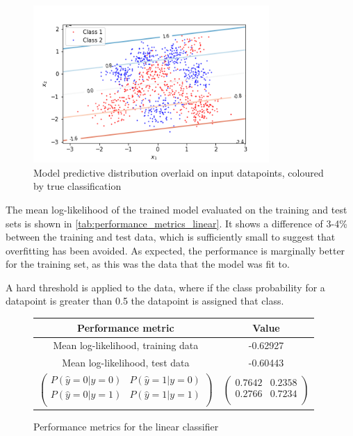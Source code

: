 \documentclass[a4paper]{article}
\begin{document}
    \begin{figure}[h]
        \label{fig:predictive_distribution_linear}
        \centering
        \includegraphics[width=0.8\textwidth]{plots/predictive_distribution_linear.png}
        \caption{Model predictive distribution overlaid on input datapoints, coloured by true classification}
    \end{figure}

    The mean log-likelihood of the trained model evaluated on the training and test sets is shown in
    \autoref{tab:performance_metrics_linear}. It shows a difference of 3-4\% between the training and test data, which is
    sufficiently small to suggest that overfitting has been avoided. As expected, the performance is marginally better
    for the training set, as this was the data that the model was fit to.

    A hard threshold is applied to the data, where if the class probability for a datapoint is greater than 0.5 the
    datapoint is assigned that class.

    \begin{figure}[h]
        \label{tab:performance_metrics_linear}
        \centering
        \begin{tabular}{c|c}
            \textbf{Performance metric} & \textbf{Value} \\
            \hline
            Mean log-likelihood, training data & -0.62927 \\
            Mean log-likelihood, test data & -0.60443 \\
            $\begin{pmatrix}
                 P(\hat{y}=0 | y=0) & P(\hat{y}=1 | y=0) \\
                 P(\hat{y}=0 | y=1) & P(\hat{y}=1 | y=1) \\
            \end{pmatrix}$ &
            $\begin{pmatrix}
                0.7642 & 0.2358 \\
                0.2766 & 0.7234 \\
            \end{pmatrix}$ \\
        \end{tabular}
        \caption{Performance metrics for the linear classifier}
    \end{figure}
\end{document}
